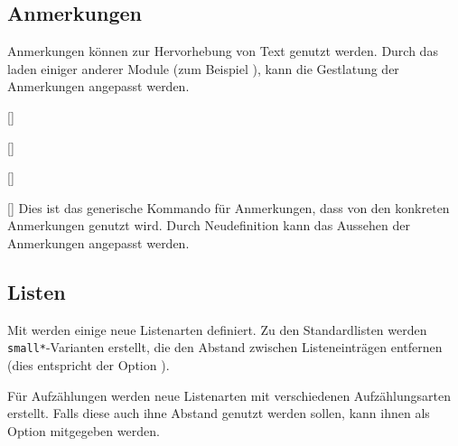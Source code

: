 \subsection{Anmerkungen}\label{subsec:typo-anmerkungen}
Anmerkungen können zur Hervorhebung von Text genutzt werden. Durch das laden einiger
anderer Module (zum Beispiel ), kann die Gestlatung der Anmerkungen
angepasst werden.

\begin{commands}
	\begin{example}[side-by-side,add-silent-cmds={hinweis,tipp,frage,warnung}]
  \end{example}

	[]
	\begin{example}[side-by-side,add-silent-cmds={hinweis,tipp,frage,warnung}]
  \end{example}

	[]
	\begin{example}[side-by-side,add-silent-cmds={hinweis,tipp,frage,warnung}]
  \end{example}

	[]
	\begin{example}[side-by-side,add-silent-cmds={hinweis,tipp,frage,warnung}]
  \end{example}

	[]
	Dies ist das generische Kommando für Anmerkungen, dass von den konkreten Anmerkungen
	genutzt wird. Durch Neudefinition kann das Aussehen der Anmerkungen angepasst werden.
\end{commands}

\subsection{Listen}\label{subsec:typo-listen}

Mit  werden einige neue Listenarten definiert. Zu den Standardlisten
werden \texttt{small*}-Varianten erstellt, die den Abstand zwischen Listeneinträgen
entfernen (dies entspricht der  Option ).

Für Aufzählungen werden neue Listenarten mit verschiedenen Aufzählungsarten erstellt.
Falls diese auch ihne Abstand genutzt werden sollen, kann ihnen als Option
 mitgegeben werden.

